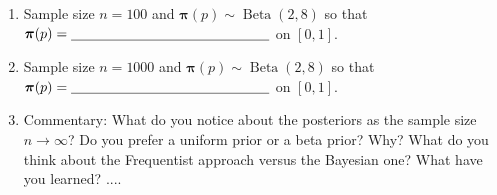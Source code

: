 \documentclass{report}
\newcommand\Beta{\operatorname{Beta}}
\begin{document}
\begin{enumerate}

\item Sample size $n = 100$ and $\boldsymbol{\pi}(p) \sim \Beta(2,8)$ so that $\boldsymbol{\pi}(p) = \underline{\hskip 5cm}$ on $[0,1]$.

\smallskip


\item Sample size $n = 1000$ and $\boldsymbol{\pi}(p) \sim \Beta(2,8)$ so that $\boldsymbol{\pi}(p) = \underline{\hskip 5cm}$ on $[0,1]$.

\smallskip


\item Commentary:  What do you notice about the posteriors as the sample size $n \to \infty$?  Do you prefer
a uniform prior or a beta prior?  Why?  What do you think about the Frequentist approach versus the Bayesian one?  
What have you learned? ....

\end{enumerate}
\end{document}
